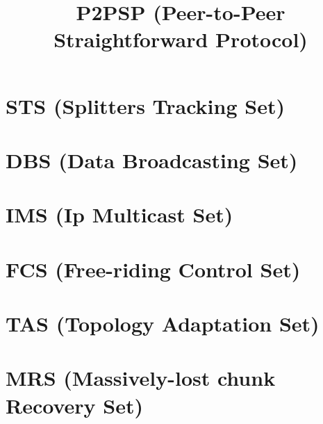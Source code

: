 
\newcommand{\note}[1]{\color{red}{\vbox{\textbf{#1}}}}


\newenvironment{notex}
               {\textbf{Note:}
               }
               {
               }

\title{P2PSP (Peer-to-Peer Straightforward Protocol)}
\maketitle

\begin{abstract}

\end{abstract}

\tableofcontents

\section{STS (Splitters Tracking Set)}


\section{DBS (Data Broadcasting Set)}


\section{IMS (Ip Multicast Set)}


\section{FCS (Free-riding Control Set)}


\section{TAS (Topology Adaptation Set)}


\section{MRS (Massively-lost chunk Recovery Set)}


